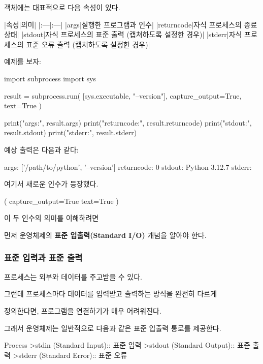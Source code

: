  객체에는 대표적으로 다음 속성이 있다.

\begin{dhktable}
|속성|의미|
|:---|:---|
|args|실행한 프로그램과 인수|
|returncode|자식 프로세스의 종료 상태|
|stdout|자식 프로세스의 표준 출력 (캡쳐하도록 설정한 경우)|
|stderr|자식 프로세스의 표준 오류 출력 (캡쳐하도록 설정한 경우)|
\end{dhktable}

예제를 보자:

\begin{dhkcode}
import subprocess
import sys

result = subprocess.run(
    [sys.executable, "--version"],
    capture_output=True,
    text=True
)

print("args:", result.args)
print("returncode:", result.returncode)
print("stdout:", result.stdout)
print("stderr:", result.stderr)
\end{dhkcode}

예상 출력은 다음과 같다:

\begin{dhkzsh}
args: ['/path/to/python', '--version']
returncode: 0
stdout: Python 3.12.7
stderr:
\end{dhkzsh}

여기서 새로운 인수가 등장했다.

\begin{dhkcode}
(
    capture_output=True
    text=True
)
\end{dhkcode}

이 두 인수의 의미를 이해하려면 

먼저 운영체제의 \textbf{표준 입출력(Standard I/O)} 개념을 알아야 한다.

\subsubsection{표준 입력과 표준 출력}

프로세스는 외부와 데이터를 주고받을 수 있다.

그런데 프로세스마다 데이터를 입력받고 출력하는 방식을 완전히 다르게 

정의한다면, 프로그램을 연결하기가 매우 어려워진다.

그래서 운영체제는 일반적으로 다음과 같은 표준 입출력 통로를 제공한다.

\begin{dhktree}
Process
>stdin (Standard Input):: 표준 입력
>stdout (Standard Output):: 표준 출력
>stderr (Standard Error):: 표준 오류
\end{dhktree}

